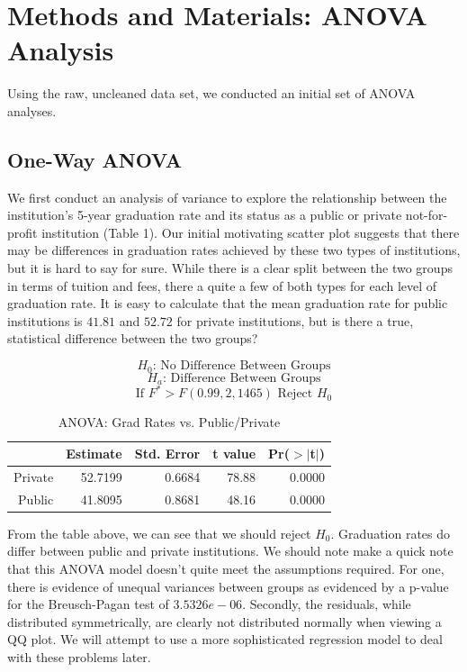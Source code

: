 \documentclass{article}
\begin{document}
\section{Methods and Materials: ANOVA Analysis}

Using the raw, uncleaned data set, we conducted an initial set of ANOVA analyses.

\subsection{One-Way ANOVA}

We first conduct an analysis of variance to explore the relationship between the institution's 5-year graduation rate and its status as a public or private not-for-profit institution (Table 1). Our initial motivating scatter plot suggests that there may be differences in graduation rates achieved by these two types of institutions, but it is hard to say for sure. While there is a clear split between the two groups in terms of tuition and fees, there a quite a few of both types for each level of graduation rate. It is easy to calculate that the mean graduation rate for public institutions is $41.81$ and $52.72$ for private institutions, but is there a true, statistical difference between the two groups?

$$ H_0\text{: No Difference Between Groups} $$
$$ H_a\text{: Difference Between Groups} $$
$$ \text{If }F^* > F(0.99,2,1465)\text{ Reject }H_0 $$

\begin{table}[ht]
\centering
\footnotesize
\begin{tabular}{rrrrr}
  \hline
 & Estimate & Std. Error & t value & Pr($>$$|$t$|$) \\ 
  \hline
Private & 52.7199 & 0.6684 & 78.88 & 0.0000 \\ 
Public & 41.8095 & 0.8681 & 48.16 & 0.0000 \\ 
   \hline
\end{tabular}
\caption{ANOVA: Grad Rates vs. Public/Private} 
\end{table}
\FloatBarrier

From the table above, we can see that we should reject $H_0$. Graduation rates do differ between public and private institutions. We should note make a quick note that this ANOVA model doesn't quite meet the assumptions required. For one, there is evidence of unequal variances between groups as evidenced by a p-value for the Breusch-Pagan test of $3.5326e-06$. Secondly, the residuals, while distributed symmetrically, are clearly not distributed normally when viewing a QQ plot. We will attempt to use a more sophisticated regression model to deal with these problems later.
\end{document}
